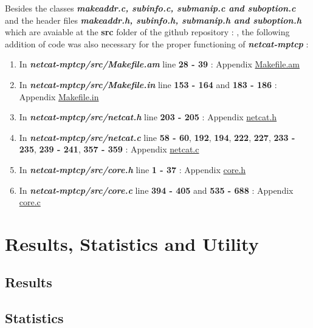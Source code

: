 \documentclass[a4paper,11pt]{article}
\begin{document}
			Besides the classes \textbf{\emph{makeaddr.c, subinfo.c, submanip.c and suboption.c}} and the header files \textbf{\emph{makeaddr.h, subinfo.h, submanip.h and suboption.h}} which are avaiable at the \textbf{src} folder of the github repository : \cite[https://github.com/lawrenceFR/netcat-mptcp]{github}, the following addition of code was also necessary for the proper functioning of \textbf{\emph{netcat-mptcp}} :
			\begin{enumerate}
				\item In \textbf{\emph{netcat-mptcp/src/Makefile.am}} line \textbf{28 - 39} : Appendix \hyperref[subsec:Makefile.am]{Makefile.am}

				\item In \textbf{\emph{netcat-mptcp/src/Makefile.in}} line \textbf{153 - 164} and \textbf{183 - 186} : Appendix \hyperref[subsec:Makefile.in]{Makefile.in}

				\item In \textbf{\emph{netcat-mptcp/src/netcat.h}} line \textbf{203 - 205} : Appendix \hyperref[subsec:netcat.h]{netcat.h}

				\item In \textbf{\emph{netcat-mptcp/src/netcat.c}} line \textbf{58 - 60}, \textbf{192}, \textbf{194}, \textbf{222}, \textbf{227}, \textbf{233 - 235}, \textbf{239 - 241}, \textbf{357 - 359} : Appendix \hyperref[subsec:netcat.c]{netcat.c}

				\item In \textbf{\emph{netcat-mptcp/src/core.h}} line \textbf{1 - 37} : Appendix \hyperref[subsec:core.h]{core.h}

				\item In \textbf{\emph{netcat-mptcp/src/core.c}} line \textbf{394 - 405} and \textbf{535 - 688} : Appendix \hyperref[subsec:core.c]{core.c}
			\end{enumerate}
			
	\clearpage
	\section{Results, Statistics and Utility}
		\label{sec:res}
		\subsection{Results}
			\label{subsec:result}
		\subsection{Statistics}
			\label{subsec:statistics}
\end{document}

